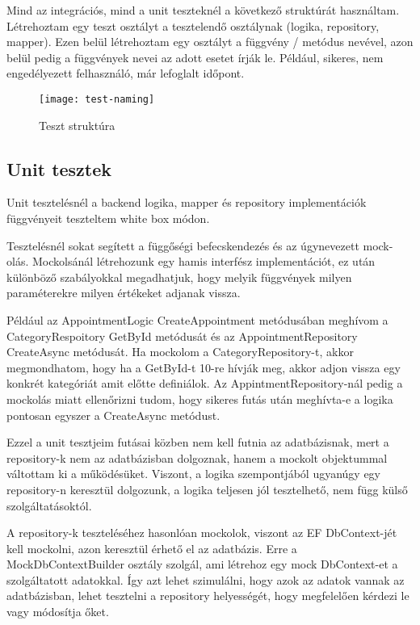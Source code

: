 Mind az integrációs, mind a unit teszteknél a következő struktúrát használtam. Létrehoztam egy teszt osztályt a tesztelendő osztálynak (logika, repository, mapper). Ezen belül létrehoztam egy osztályt a függvény / metódus nevével, azon belül pedig a függvények nevei az adott esetet írják le. Például, sikeres, nem engedélyezett felhasználó, már lefoglalt időpont.

\begin{figure}[H]
	\centering
	\texttt{[image: test-naming]}
	\caption{Teszt struktúra}
\end{figure}


\subsection{Unit tesztek}
\label{sec:unittests}
Unit tesztelésnél a backend logika, mapper és repository implementációk függvényeit teszteltem white box módon.

Tesztelésnél sokat segített a függőségi befecskendezés és az úgynevezett mock-olás. Mockolsánál létrehozunk egy hamis interfész implementációt, ez után különböző szabályokkal megadhatjuk, hogy melyik függvények milyen paraméterekre milyen értékeket adjanak vissza.

Például az AppointmentLogic CreateAppointment metódusában meghívom a CategoryRespoitory GetById metódusát és az AppointmentRepository CreateAsync metódusát. Ha mockolom a CategoryRepository-t, akkor megmondhatom, hogy ha a GetById-t 10-re hívják meg, akkor adjon vissza egy konkrét kategóriát amit előtte definiálok. Az AppintmentRepository-nál pedig a mockolás miatt ellenőrizni tudom, hogy sikeres futás után meghívta-e a logika pontosan egyszer a CreateAsync metódust.

Ezzel a unit tesztjeim futásai közben nem kell futnia az adatbázisnak, mert a repository-k nem az adatbázisban dolgoznak, hanem a mockolt objektummal váltottam ki a működésüket. Viszont, a logika szempontjából ugyanúgy egy repository-n keresztül dolgozunk, a logika teljesen jól tesztelhető, nem függ külső szolgáltatásoktól.

A repository-k teszteléséhez hasonlóan mockolok, viszont az EF DbContext-jét kell mockolni, azon keresztül érhető el az adatbázis. Erre a MockDbContextBuilder osztály szolgál, ami létrehoz egy mock DbContext-et a szolgáltatott adatokkal. Így azt lehet szimulálni, hogy azok az adatok vannak az adatbázisban, lehet tesztelni a repository helyességét, hogy megfelelően kérdezi le vagy módosítja őket.

